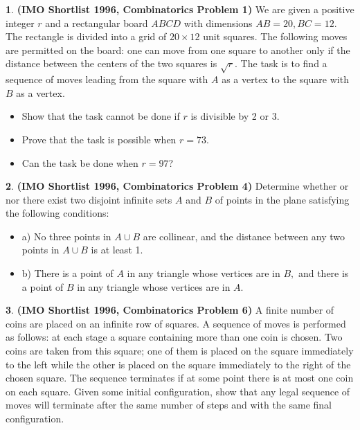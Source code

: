 \documentclass{article}
\newcommand{\equal}{=}
\theoremstyle{definition}
\newtheorem{p}{}
\begin{document}
\begin{p}{\bf (IMO Shortlist 1996, Combinatorics Problem 1)}
We are given a positive integer $ r$ and a rectangular board $ ABCD$ with dimensions $ AB \equal{} 20, BC \equal{} 12$. The rectangle is divided into a grid of $ 20 \times 12$ unit squares. The following moves are permitted on the board: one can move from one square to another only if the distance between the centers of the two squares is $ \sqrt {r}$. The task is to find a sequence of moves leading from the square with $ A$ as a vertex to the square with $ B$ as a vertex.
\begin{itemize}
\item Show that the task cannot be done if $ r$ is divisible by 2 or 3.

\item Prove that the task is possible when $ r \equal{} 73$. 

\item Can the task be done when $ r \equal{} 97$?
\end{itemize}
\end{p}



\begin{p}{\bf (IMO Shortlist 1996, Combinatorics Problem 4)}
Determine whether or nor there exist two disjoint infinite sets $ A$ and $ B$ of points in the plane satisfying the following conditions:
\begin{itemize}
\item a) No three points in $ A \cup B$ are collinear, and the distance between any two points in $ A \cup B$ is at least 1.

\item b) There is a point of $ A$ in any triangle whose vertices are in $ B,$ and there is a point of $ B$ in any triangle whose vertices are in $ A.$
\end{itemize}
\end{p}


\begin{p}{\bf (IMO Shortlist 1996, Combinatorics Problem 6)}
A finite number of coins are placed on an infinite row of squares. A sequence of moves is performed as follows: at each stage a square containing more than one coin is chosen. Two coins are taken from this square; one of them is placed on the square immediately to the left while the other is placed on the square immediately to the right of the chosen square. The sequence terminates if at some point there is at most one coin on each square. Given some initial configuration, show that any legal sequence of moves will terminate after the same number of steps and with the same final configuration.
\end{p}
\end{document}
